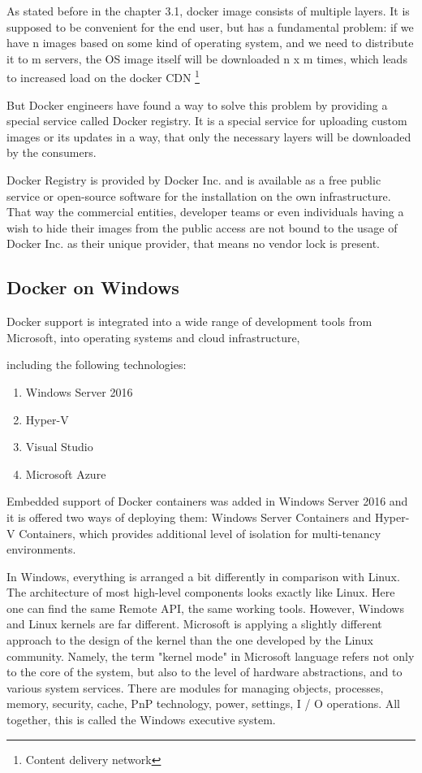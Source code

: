 As stated before in the chapter 3.1, docker image consists of multiple layers.
It is supposed to be convenient for the end user,
but has a fundamental problem: if we have
n images based on some kind of operating system, and we need
to distribute it to m servers, the OS image itself will be downloaded
n x m times, which leads to increased
load on the docker CDN \footnote{Content delivery network}

But Docker engineers have found a way to solve this problem by providing
a special service called Docker registry. It is a special service for uploading
custom images or its updates in a way, that only the necessary layers will be
downloaded by the consumers.

Docker Registry is provided by Docker Inc. and is available
as a free public service or open-source software
for the installation on the own infrastructure.
That way the commercial entities, developer teams or even individuals having a
wish to hide their images from the public access
are not bound to the usage of Docker Inc. as their unique provider, that means
no vendor lock is present.

\subsection{Docker on Windows}

Docker support is integrated into a wide range of development tools
from Microsoft, into operating systems and cloud infrastructure,

including the following technologies:
\begin{enumerate}
\item Windows Server 2016
\item Hyper-V
\item Visual Studio
\item Microsoft Azure
\end{enumerate}

Embedded support of Docker containers was added in Windows Server 2016 and it
is offered  two ways of  deploying them: Windows Server Containers and
Hyper-V Containers, which provides additional level of
isolation for multi-tenancy environments.

In Windows, everything is arranged a bit differently in comparison with Linux.
The architecture of most high-level components looks exactly like Linux.
Here one can find the same Remote API, the same working tools.
However, Windows and Linux kernels are far different.
Microsoft is applying a slightly different approach to the design of the
kernel than the one developed by the Linux community.
Namely, the term "kernel mode" in Microsoft language refers not only to the
core of the system, but also to the level of hardware abstractions, and to
various system services.
There are modules for managing objects, processes, memory, security,
cache, PnP technology, power, settings, I / O operations.
All together, this is called the Windows executive system.

